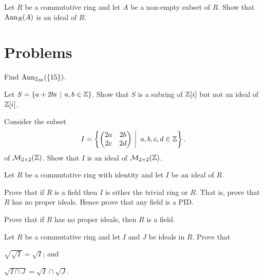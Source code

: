 \begin{exercise}\label{exercise-annihilator-is-an-ideal}
    Let $R$ be a commutative ring and let $A$ be a non-empty subset of $R$. Show that $\mathrm{Ann}_{R}(A)$ is an ideal of $R$.
\end{exercise}

\newpage

\section{Problems}
\begin{problem}
    Find $\mathrm{Ann}_{\mathbb{Z}_{36}}(\{15\})$.
\end{problem}

\begin{problem}
    Let $S = \{a + 2bi \vert a, b \in \Z\}$. Show that $S$ is a subring of $\mathbb{Z}[i]$ but not an ideal of $\mathbb{Z}[i]$.
\end{problem}

\begin{problem}
    Consider the subset
    \[
        I = \left\{\begin{pmatrix}2a&2b\\2c&2d\end{pmatrix} \vert a,b,c,d \in \Z\right\}.
    \]
    of $\mathcal{M}_{2\times2}(\mathbb{Z})$. Show that $I$ is an ideal of $\mathcal{M}_{2\times2}(\mathbb{Z})$.
\end{problem}

\begin{problem}\label{problem-ring-is-field-iff-no-proper-ideals}
    Let $R$ be a commutative ring with identity and let $I$ be an ideal of $R$.
    \begin{partquestions}{\alph*}
        \item Prove that if $R$ is a field then $I$ is either the trivial ring or $R$. That is, prove that $R$ has no proper ideals. Hence prove that any field is a PID.
        \item Prove that if $R$ has no proper ideals, then $R$ is a field.
    \end{partquestions}
\end{problem}

\begin{problem}
    Let $R$ be a commutative ring and let $I$ and $J$ be ideals in $R$. Prove that
    \begin{partquestions}{\alph*}
        \item $\sqrt{\sqrt{I}} = \sqrt{I}$; and
        \item $\sqrt{I \cap J} = \sqrt{I} \cap \sqrt{J}$.
    \end{partquestions}
\end{problem}

